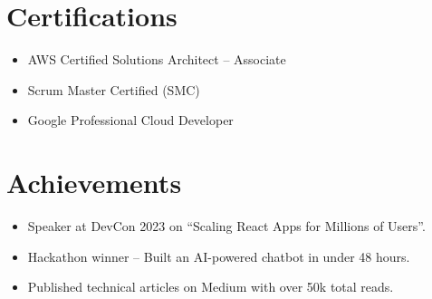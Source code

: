 \documentclass[a4paper,11pt]{article}
\begin{document}
\section*{Certifications}
\begin{itemize}
    \item AWS Certified Solutions Architect – Associate
    \item Scrum Master Certified (SMC)
    \item Google Professional Cloud Developer
\end{itemize}

\section*{Achievements}
\begin{itemize}
    \item Speaker at DevCon 2023 on “Scaling React Apps for Millions of Users”.
    \item Hackathon winner – Built an AI-powered chatbot in under 48 hours.
    \item Published technical articles on Medium with over 50k total reads.
\end{itemize}
\end{document}
